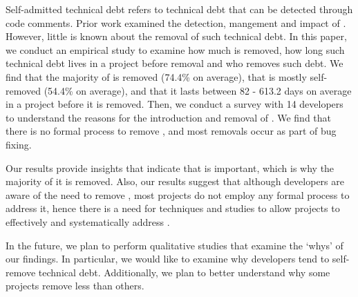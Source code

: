 Self-admitted technical debt refers to technical debt that can be detected through code comments. Prior work examined the detection, mangement and impact of \SATD. However, little is known about the removal of such technical debt. In this paper, we conduct an empirical study to examine how much \SATD is removed, how long such technical debt lives in a project before removal and who removes such debt. We find that the majority of \SATD is removed (74.4\% on average), that \SATD is mostly self-removed (54.4\% on average), and that it lasts between 82 - 613.2 days on average in a project before it is removed. Then, we conduct a survey with 14 developers to understand the reasons for the introduction and removal of \SATD. We find that there is no formal process to remove \SATD, and most removals occur as part of bug fixing.

Our results provide insights that indicate that \SATD is important, which is why the majority of it is removed. Also, our results suggest that although developers are aware of the need to remove \SATD, most projects do not employ any formal process to address it, hence there is a need for techniques and studies to allow projects to effectively and systematically address \SATD.

In the future, we plan to perform qualitative studies that examine the `whys' of our findings. In particular, we would like to examine why developers tend to self-remove technical debt. Additionally, we plan to better understand why some projects remove less \SATD than others.